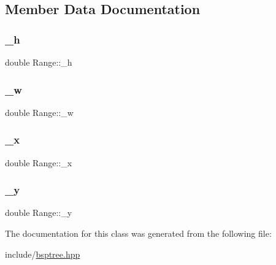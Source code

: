 \subsection{Member Data Documentation}
\mbox{\label{classRange_aa28af6a934404eae4bc9cb016b48fc60_aa28af6a934404eae4bc9cb016b48fc60}} 
\subsubsection{\texorpdfstring{\+\_\+h}{\_h}}
{\footnotesize\ttfamily double Range\+::\+\_\+h\hspace{0.3cm}{\ttfamily [private]}}

\mbox{\label{classRange_a17489275052a741da3c4f7f287a5bea5_a17489275052a741da3c4f7f287a5bea5}} 
\subsubsection{\texorpdfstring{\+\_\+w}{\_w}}
{\footnotesize\ttfamily double Range\+::\+\_\+w\hspace{0.3cm}{\ttfamily [private]}}

\mbox{\label{classRange_a63693ff85463b676ee7451693af5c2c1_a63693ff85463b676ee7451693af5c2c1}} 
\subsubsection{\texorpdfstring{\+\_\+x}{\_x}}
{\footnotesize\ttfamily double Range\+::\+\_\+x\hspace{0.3cm}{\ttfamily [private]}}

\mbox{\label{classRange_a5367235978a597b4ff99d50c2e06663c_a5367235978a597b4ff99d50c2e06663c}} 
\subsubsection{\texorpdfstring{\+\_\+y}{\_y}}
{\footnotesize\ttfamily double Range\+::\+\_\+y\hspace{0.3cm}{\ttfamily [private]}}



The documentation for this class was generated from the following file\+:\begin{DoxyCompactItemize}
\item 
include/\hyperlink{bsptree_8hpp}{bsptree.\+hpp}\end{DoxyCompactItemize}
